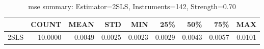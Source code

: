 \begin{table}[ht]
\centering
\caption{mse summary: Estimator=2SLS, Instruments=142, Strength=0.70}
\begin{tabular}{lrrrrrrrr}
\toprule
 & COUNT & MEAN & STD & MIN & 25\% & 50\% & 75\% & MAX \\
\midrule
2SLS & 10.0000 & 0.0049 & 0.0025 & 0.0023 & 0.0029 & 0.0043 & 0.0057 & 0.0101 \\
\bottomrule
\end{tabular}
\end{table}

